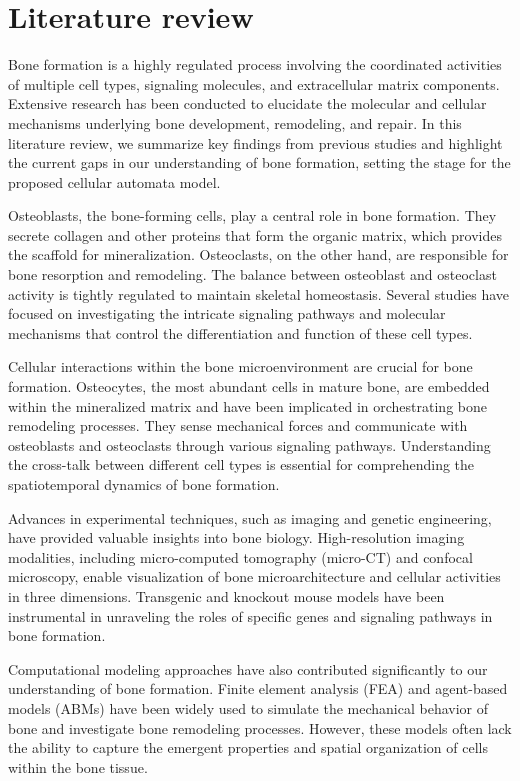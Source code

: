 \documentclass[conference]{IEEEtran}
\begin{document}
\section{Literature review}
Bone formation is a highly regulated process involving the coordinated activities of multiple cell types, signaling molecules, and extracellular matrix components. Extensive research has been conducted to elucidate the molecular and cellular mechanisms underlying bone development, remodeling, and repair. In this literature review, we summarize key findings from previous studies and highlight the current gaps in our understanding of bone formation, setting the stage for the proposed cellular automata model.

Osteoblasts, the bone-forming cells, play a central role in bone formation. They secrete collagen and other proteins that form the organic matrix, which provides the scaffold for mineralization. Osteoclasts, on the other hand, are responsible for bone resorption and remodeling. The balance between osteoblast and osteoclast activity is tightly regulated to maintain skeletal homeostasis. Several studies have focused on investigating the intricate signaling pathways and molecular mechanisms that control the differentiation and function of these cell types.

Cellular interactions within the bone microenvironment are crucial for bone formation. Osteocytes, the most abundant cells in mature bone, are embedded within the mineralized matrix and have been implicated in orchestrating bone remodeling processes. They sense mechanical forces and communicate with osteoblasts and osteoclasts through various signaling pathways. Understanding the cross-talk between different cell types is essential for comprehending the spatiotemporal dynamics of bone formation.

Advances in experimental techniques, such as imaging and genetic engineering, have provided valuable insights into bone biology. High-resolution imaging modalities, including micro-computed tomography (micro-CT) and confocal microscopy, enable visualization of bone microarchitecture and cellular activities in three dimensions. Transgenic and knockout mouse models have been instrumental in unraveling the roles of specific genes and signaling pathways in bone formation.

Computational modeling approaches have also contributed significantly to our understanding of bone formation. Finite element analysis (FEA) and agent-based models (ABMs) have been widely used to simulate the mechanical behavior of bone and investigate bone remodeling processes. However, these models often lack the ability to capture the emergent properties and spatial organization of cells within the bone tissue.
\end{document}
